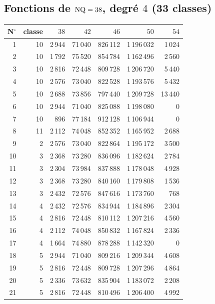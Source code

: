 \subsection{Fonctions de $\mathrm{NQ}=38$, degré $4$ (33 classes)}\label{tab:annexe38_4}
\begin{center}\footnotesize\setlength{\tabcolsep}{4pt}
\begin{longtable}{r r r r r r r }
\toprule
N$^\circ$ & classe & $38$ & $42$ & $46$ & $50$ & $54$\\
\midrule
\endhead
1 & 10 & 2\,944 & 71\,040 & 826\,112 & 1\,196\,032 & 1\,024 \\
2 & 10 & 1\,792 & 75\,520 & 854\,784 & 1\,162\,496 & 2\,560 \\
3 & 10 & 2\,816 & 72\,448 & 809\,728 & 1\,206\,720 & 5\,440 \\
4 & 10 & 2\,576 & 73\,040 & 822\,528 & 1\,193\,576 & 5\,432 \\
5 & 10 & 2\,688 & 73\,856 & 797\,440 & 1\,209\,728 & 13\,440 \\
6 & 10 & 2\,944 & 71\,040 & 825\,088 & 1\,198\,080 & 0 \\
7 & 10 & 896 & 77\,184 & 912\,128 & 1\,106\,944 & 0 \\
8 & 11 & 2\,112 & 74\,048 & 852\,352 & 1\,165\,952 & 2\,688 \\
9 & 2 & 2\,576 & 73\,040 & 822\,864 & 1\,195\,172 & 3\,500 \\
10 & 3 & 2\,368 & 73\,280 & 836\,096 & 1\,182\,624 & 2\,784 \\
11 & 3 & 2\,304 & 73\,984 & 837\,888 & 1\,178\,048 & 4\,928 \\
12 & 3 & 2\,368 & 73\,280 & 840\,160 & 1\,179\,808 & 1\,536 \\
13 & 3 & 2\,432 & 72\,576 & 847\,616 & 1\,173\,760 & 768 \\
14 & 4 & 2\,432 & 72\,576 & 834\,944 & 1\,184\,896 & 2\,304 \\
15 & 4 & 2\,816 & 72\,448 & 810\,112 & 1\,207\,216 & 4\,560 \\
16 & 4 & 2\,112 & 74\,048 & 850\,832 & 1\,167\,824 & 2\,336 \\
17 & 4 & 1\,664 & 74\,880 & 878\,288 & 1\,142\,320 & 0 \\
18 & 5 & 2\,944 & 71\,040 & 809\,216 & 1\,209\,344 & 4\,608 \\
19 & 5 & 2\,816 & 72\,448 & 809\,728 & 1\,207\,296 & 4\,864 \\
20 & 5 & 2\,336 & 73\,632 & 835\,904 & 1\,183\,072 & 2\,208 \\
21 & 5 & 2\,816 & 72\,448 & 810\,496 & 1\,206\,400 & 4\,992 \\

\end{longtable}
\end{center}
